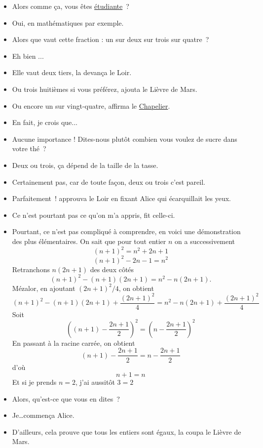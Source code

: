 \documentclass[a4paper,12pt]{book}
\theoremstyle{mes_exemples}	\newtheorem{exemple}[numtho]{Exemple}
\theoremstyle{mes_tho}
\begin{document}
 \begin{itemize}

 \item Alors comme ça, vous êtes \href{http://fr.wikipedia.org/wiki/Manifestations_de_la_place_Tian'anmen}{étudiante}~?
 \item Oui, en mathématiques par exemple.
 \item Alors que vaut cette fraction : un sur deux sur trois sur quatre~?
 \item Eh bien ...
 \item Elle vaut deux tiers, la devança le Loir.
 \item Ou trois huitièmes si vous préférez, ajouta le Lièvre de Mars.
 \item Ou encore un sur vingt-quatre, affirma le  \href{http://fr.wikipedia.org/wiki/http://fr.wikipedia.org/wiki/Chapelier_fou_(Alice_au_pays_des_merveilles)}{Chapelier}.
 \item En fait, je crois que...
\item Aucune importance ! Dites-nous plutôt combien vous voulez de sucre dans votre thé~?
\item Deux ou trois, ça dépend de la taille de la tasse.
\item Certainement pas, car de toute façon, deux ou trois c'est pareil.
\item Parfaitement~! approuva le Loir en fixant Alice qui écarquillait les yeux.
\item Ce n'est pourtant pas ce qu'on m'a appris, fit celle-ci.
\item Pourtant, ce n'est pas compliqué à comprendre, en voici une démonstration des plus élémentaires. On sait que pour tout entier $n$ on a successivement
                \[ 
			(n+1)^2=n^2+2n+1
		\]
                \[
			(n+1)^2-2n-1=n^2
		\]
	Retranchons $n(2n+1)$ des deux côtés
                \[
			(n+1)^2-(n+1)(2n+1)=n^2-n(2n+1).
		\]
	Mézalor, en ajoutant $(2n+1)^2/4$, on obtient
		\[ 
                	(n+1)^2-(n+1)(2n+1)+\frac{(2n+1)^2}{4}=n^2-n(2n+1)+\frac{(2n+1)^2}{4}
		\]
	Soit
		\[
	                \left((n+1)-\frac{2n+1}{2}\right)^2=\left(n-\frac{2n+1}{2}\right)^2
		\]
	En passant à la racine carrée, on obtient
		\[ 
			(n+1)-\frac{2n+1}{2}=n-\frac{2n+1}{2}
		\]
	d'où
		\[ 
			n+1=n
		\]
Et si je prends $n=2$, j'ai aussitôt $3=2$
\item Alors, qu'est-ce que vous en dites~?
\item Je\ldots commença Alice.
\item D'ailleurs, cela prouve que tous les entiers sont égaux, la coupa le Lièvre de Mars.

\end{itemize}
\end{document}
